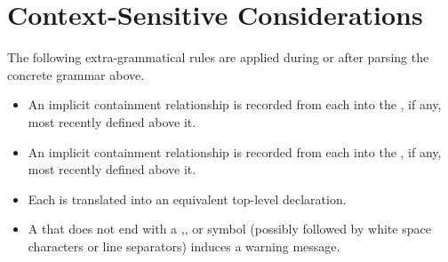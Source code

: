 \documentclass{article}
\begin{document}
\vfill\eject

\section{Context-Sensitive Considerations}

The following extra-grammatical rules are applied during or after parsing the concrete grammar above.

\begin{itemize}
\item 
  An implicit containment relationship is recorded from each  into the
  , if any, most recently defined above it.
\item
  An implicit containment relationship is recorded from each  into the
  , if any, most recently defined above it.
\item 
  Each  is translated into an equivalent top-level  declaration.
\item
  A  that does not end with a ,\gtkc{!}, or  symbol
(possibly followed by white space characters or line separators) induces a warning message.
\end{itemize}
\end{document}
